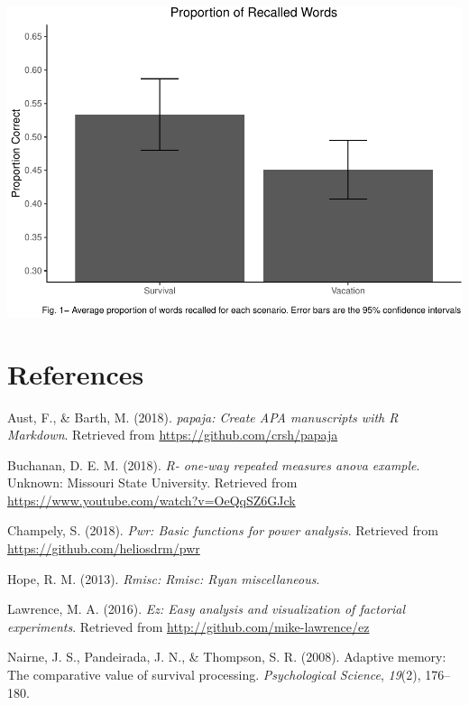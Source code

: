 \documentclass[man]{apa6}
\begin{document}
\includegraphics{Midterm_Project_files/figure-latex/unnamed-chunk-2-1.pdf}

\newpage

\hypertarget{references}{%
\section{References}\label{references}}

\begingroup
\setlength{\parindent}{-0.5in}
\setlength{\leftskip}{0.5in}

\hypertarget{refs}{}
\leavevmode\hypertarget{ref-R-papaja}{}%
Aust, F., \& Barth, M. (2018). \emph{papaja: Create APA manuscripts with R Markdown}. Retrieved from \url{https://github.com/crsh/papaja}

\leavevmode\hypertarget{ref-R-One-WayVid}{}%
Buchanan, D. E. M. (2018). \emph{R- one-way repeated measures anova example}. Unknown: Missouri State University. Retrieved from \url{https://www.youtube.com/watch?v=OeQqSZ6GJck}

\leavevmode\hypertarget{ref-R-pwr}{}%
Champely, S. (2018). \emph{Pwr: Basic functions for power analysis}. Retrieved from \url{https://github.com/heliosdrm/pwr}

\leavevmode\hypertarget{ref-R-Rmisc}{}%
Hope, R. M. (2013). \emph{Rmisc: Rmisc: Ryan miscellaneous}.

\leavevmode\hypertarget{ref-R-ez}{}%
Lawrence, M. A. (2016). \emph{Ez: Easy analysis and visualization of factorial experiments}. Retrieved from \url{http://github.com/mike-lawrence/ez}

\leavevmode\hypertarget{ref-nairne2008adaptive}{}%
Nairne, J. S., Pandeirada, J. N., \& Thompson, S. R. (2008). Adaptive memory: The comparative value of survival processing. \emph{Psychological Science}, \emph{19}(2), 176--180.
\end{document}
